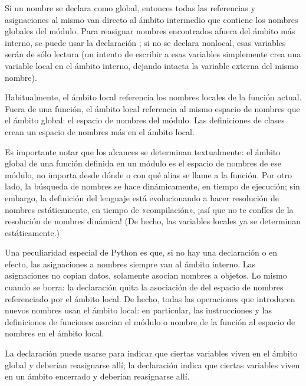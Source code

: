 \documentclass[a4,10pt,spanish]{sphinxmanual}
\begin{document}
\sphinxAtStartPar
Si un nombre se declara como global, entonces todas las referencias y asignaciones al mismo van directo al ámbito intermedio que contiene los nombres globales del módulo.  Para reasignar nombres encontrados afuera del ámbito más interno, se puede usar la declaración ; si no se declara nonlocal, esas variables serán de sólo lectura (un intento de escribir a esas variables simplemente crea una  variable local en el ámbito interno, dejando intacta la variable externa del mismo nombre).

\sphinxAtStartPar
Habitualmente, el ámbito local referencia los nombres locales de la función actual.  Fuera de una función, el ámbito local referencia al mismo espacio de nombres que el ámbito global: el espacio de nombres del módulo. Las definiciones de clases crean un espacio de nombres más en el ámbito local.

\sphinxAtStartPar
Es importante notar que los alcances se determinan textualmente: el ámbito global de una función definida en un módulo es el espacio de nombres de ese módulo, no importa desde dónde o con qué alias se llame a la función.  Por otro lado, la búsqueda de nombres se hace dinámicamente, en tiempo de ejecución; sin embargo, la definición del lenguaje está evolucionando a hacer resolución de nombres estáticamente, en tiempo de «compilación», ¡así que no te confíes de la resolución de nombres dinámica! (De hecho, las variables locales ya se determinan estáticamente.)

\sphinxAtStartPar
Una peculiaridad especial de Python es que, si no hay una declaración  o  en efecto, las asignaciones a nombres siempre van al ámbito interno.  Las asignaciones no copian datos, solamente asocian nombres a objetos.  Lo mismo cuando se borra: la declaración  quita la asociación de  del espacio de nombres referenciado por el ámbito local.  De hecho, todas las operaciones que introducen nuevos nombres usan el ámbito local: en particular, las instrucciones  y las definiciones de funciones asocian el módulo o nombre de la función al espacio de nombres en el ámbito local.

\sphinxAtStartPar
La declaración  puede usarse para indicar que ciertas variables viven en el ámbito global y deberían reasignarse allí; la declaración  indica que ciertas variables viven en un ámbito encerrado y deberían reasignarse allí.
\end{document}
